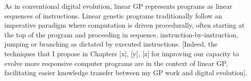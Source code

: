 As in conventional digital evolution, linear GP represents programs as linear sequences of instructions.
Linear genetic programs traditionally follow an imperative paradigm where computation is driven procedurally, often starting at the top of the program and proceeding in sequence, instruction-by-instruction, jumping or branching as dictated by executed instructions.
[Indeed, the techniques that I propose in Chapters [x], [y], [z] for improving our capacity to evolve more responsive computer programs are in the context of linear GP, facilitating easier knowledge transfer between my GP work and digital evolution]. 







